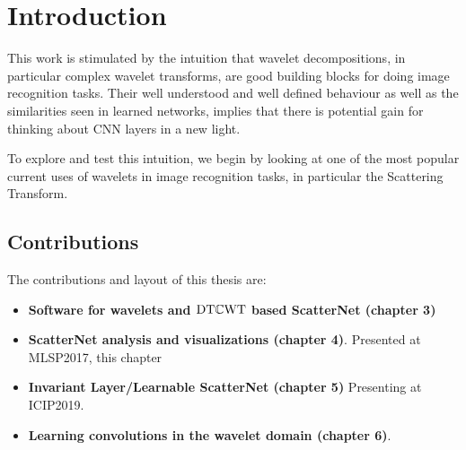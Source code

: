 \chapter{Introduction}\label{ch:intro}

This work is stimulated by the intuition that wavelet decompositions, in particular
complex wavelet transforms, are good building blocks for doing image recognition
tasks. Their well understood and well defined behaviour as well as the
similarities seen in learned networks, implies that there is potential gain for
thinking about CNN layers in a new light. 

To explore and test this intuition, we begin by looking at one of the most popular current uses of
wavelets in image recognition tasks, in particular the Scattering Transform. 


\section{Contributions}
The contributions and layout of this thesis are:

\begin{itemize}
  \item \textbf{Software for wavelets and $\mathrm{DT}\mathbb{C}\mathrm{WT}$ based ScatterNet (chapter 3)}
  \item \textbf{ScatterNet analysis and visualizations (chapter 4)}. Presented
    at MLSP2017, this chapter 
  \item \textbf{Invariant Layer/Learnable ScatterNet (chapter 5)} Presenting at
    ICIP2019.
  \item \textbf{Learning convolutions in the wavelet domain (chapter 6)}.
\end{itemize}

